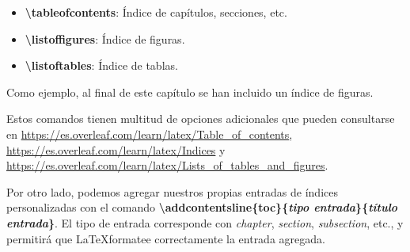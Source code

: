 \begin{itemize}
	\item \textbf{\textbackslash tableofcontents}: Índice de capítulos, secciones, etc.
	\item \textbf{\textbackslash listoffigures}: Índice de figuras.
	\item \textbf{\textbackslash listoftables}: Índice de tablas.
\end{itemize}

Como ejemplo, al final de este capítulo se han incluido un índice de figuras.

Estos comandos tienen multitud de opciones adicionales que pueden consultarse en \url{https://es.overleaf.com/learn/latex/Table_of_contents}, \url{https://es.overleaf.com/learn/latex/Indices} y \url{https://es.overleaf.com/learn/latex/Lists_of_tables_and_figures}.

Por otro lado, podemos agregar nuestros propias entradas de índices personalizadas con el comando \textbf{\textbackslash addcontentsline\{toc\}\{\emph{tipo entrada}\}\{\emph{título entrada}\}}. El tipo de entrada corresponde con \emph{chapter}, \emph{section}, \emph{subsection}, etc., y permitirá que \LaTeX formatee correctamente la entrada agregada.

\listoffigures

